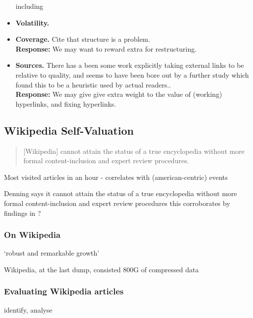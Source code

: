 \documentclass[a4paper,11pt,twoside,notitlepage]{article}
\begin{document}
\begin{itemize}
            including 
          \item \textbf{Volatility.} 
          \item \textbf{Coverage.} Cite that structure is a
            problem.\\
            \textbf{Response:} We may want to reward extra for restructuring.
          \item \textbf{Sources.} There has a been some work
            explicitly taking external links to be relative to
            quality,\cite{CITEHYPERLINKS} and seems to have been bore
            out by a further study which found this to be a heuristic
            used by actual readers.\cite{THISHEURISTICIGUESS}.\\
            \textbf{Response:} We may give give extra weight to the value
            of (working) hyperlinks, and fixing hyperlinks.
        \end{itemize}
            
        \subsection{Wikipedia Self-Valuation}
        \begin{quote}
          [Wikipedia] cannot attain the status of a true encyclopedia
          without more formal content-inclusion and expert review
          procedures.\cite{Denning2005}
        \end{quote}

        

        Most visited articles in an hour - correlates with
        (american-centric) events \cite{wiki-visits}

        Denning says it cannot attain the status of a true
        encyclopedia without more formal content-inclusion and expert
        review procedures\cite{Denning2005} this corroborates by
        findings in \cite{Giles2005}?

        \subsubsection{On Wikipedia}
        `robust and remarkable growth'
        \cite{Kittur2007}\cite{Voss2005} 
        
        Wikipedia, at the last dump, consisted 800G of compressed data
        \cite{wiki-dump}

        \subsubsection{Evaluating Wikipedia articles}
        identify, analyse
\end{document}
